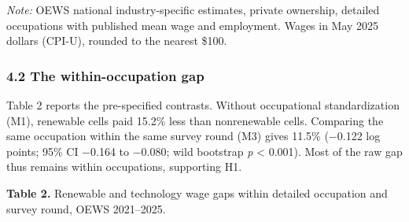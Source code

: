 \documentclass[
  11pt,
]{article}
\begin{document}
\emph{Note:} OEWS national industry-specific estimates, private
ownership, detailed occupations with published mean wage and employment.
Wages in May 2025 dollars (CPI-U), rounded to the nearest \$100.

\subsubsection{4.2 The within-occupation
gap}\label{the-within-occupation-gap}

Table 2 reports the pre-specified contrasts. Without occupational
standardization (M1), renewable cells paid 15.2\% less than nonrenewable
cells. Comparing the same occupation within the same survey round (M3)
gives 11.5\% (−0.122 log points; 95\% CI −0.164 to −0.080; wild
bootstrap \emph{p} \textless{} 0.001). Most of the raw gap thus remains
within occupations, supporting H1.

\textbf{Table 2.} Renewable and technology wage gaps within detailed
occupation and survey round, OEWS 2021--2025.
\end{document}
